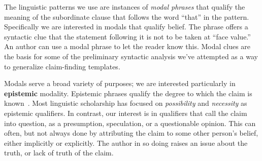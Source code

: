 
The linguistic patterns we use are instances of {\it modal phrases} that qualify the meaning of the subordinate clause that follows the word ``that'' in the pattern. Specifically we are interested in
modals that qualify belief.  The phrase offers a syntactic clue that the statement following it
is not to be taken at ``face value.''  An author can use a modal phrase to let the reader know
this.  Modal clues are the basis for some of the preliminary syntactic analysis
we've attempted as a way to generalize claim-finding templates. 

Modals serve a broad variety of purposes;
we are interested particularly in  {\bf epistemic} modality. Epistemic phrases qualify the
degree to which the claim is known~\cite{Palmer.2001}. Most linguistic scholarship has focused on {\it
possibility} and {\it necessity} as epistemic qualifiers. In
contrast, our interest is in qualifiers that call the claim into
question, as a presumption, speculation, or a questionable
opinion. This can often, but not always done by attributing the claim
to some other person's belief, either implicitly or explicitly. The
author in so doing raises an issue about the truth, or lack of truth
of the claim.
